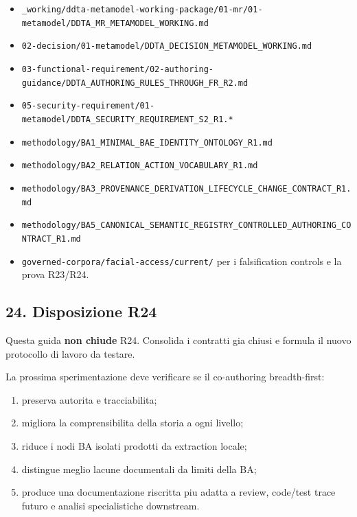 \documentclass[
  9pt,
  a4paper,
]{article}
\providecommand{\tightlist}{%
  \setlength{\itemsep}{0pt}\setlength{\parskip}{0pt}}
\begin{document}
\begin{itemize}
\tightlist
\item
  \texttt{\_working/ddta-metamodel-working-package/01-mr/01-metamodel/DDTA\_MR\_METAMODEL\_WORKING.md}
\item
  \texttt{02-decision/01-metamodel/DDTA\_DECISION\_METAMODEL\_WORKING.md}
\item
  \texttt{03-functional-requirement/02-authoring-guidance/DDTA\_AUTHORING\_RULES\_THROUGH\_FR\_R2.md}
\item
  \texttt{05-security-requirement/01-metamodel/DDTA\_SECURITY\_REQUIREMENT\_S2\_R1.*}
\item
  \texttt{methodology/BA1\_MINIMAL\_BAE\_IDENTITY\_ONTOLOGY\_R1.md}
\item
  \texttt{methodology/BA2\_RELATION\_ACTION\_VOCABULARY\_R1.md}
\item
  \texttt{methodology/BA3\_PROVENANCE\_DERIVATION\_LIFECYCLE\_CHANGE\_CONTRACT\_R1.md}
\item
  \texttt{methodology/BA5\_CANONICAL\_SEMANTIC\_REGISTRY\_CONTROLLED\_AUTHORING\_CONTRACT\_R1.md}
\item
  \texttt{governed-corpora/facial-access/current/} per i falsification
  controls e la prova R23/R24.
\end{itemize}

\subsection{24. Disposizione R24}\label{disposizione-r24}

Questa guida \textbf{non chiude} R24. Consolida i contratti gia chiusi e
formula il nuovo protocollo di lavoro da testare.

La prossima sperimentazione deve verificare se il co-authoring
breadth-first:

\begin{enumerate}
\def\labelenumi{\arabic{enumi}.}
\tightlist
\item
  preserva autorita e tracciabilita;
\item
  migliora la comprensibilita della storia a ogni livello;
\item
  riduce i nodi BA isolati prodotti da extraction locale;
\item
  distingue meglio lacune documentali da limiti della BA;
\item
  produce una documentazione riscritta piu adatta a review, code/test
  trace futuro e analisi specialistiche downstream.
\end{enumerate}
\end{document}
